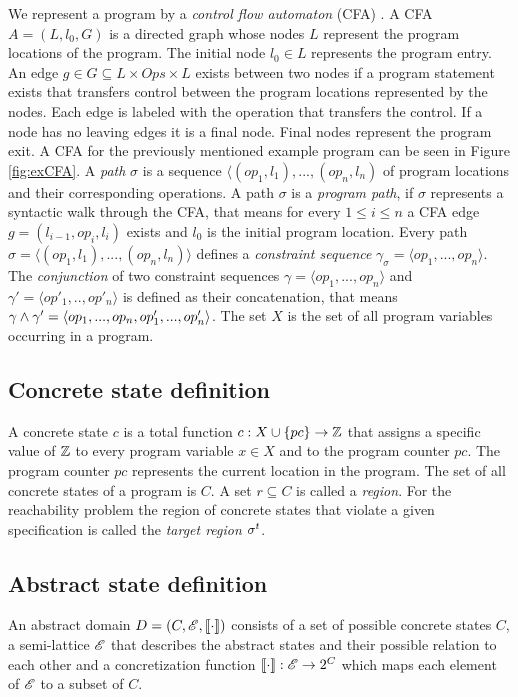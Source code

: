 We represent a program by a \emph{control flow automaton} (CFA) \cite{BeyerBook}\cite{Beyer2012}.
A CFA $A = (L, l_0, G)$ is a directed graph whose nodes $L$ represent the program locations of the program.
The initial node $l_0 \in L$ represents the program entry.
An edge $g \in G \subseteq L \times Ops \times L$ exists between two nodes if a program statement exists that transfers control between the program locations represented by the nodes.
Each edge is labeled with the operation that transfers the control.
If a node has no leaving edges it is a final node. Final nodes represent the program exit.
A CFA for the previously mentioned example program can be seen in Figure \ref{fig:exCFA}.
A \emph{path} $\sigma$ \cite{Beyer2015} is a sequence $\langle (op_1, l_1), ..., (op_n, l_n)$ of program locations and their corresponding operations.
A path $\sigma$ is a \emph{program path}, if $\sigma$ represents a syntactic walk through the CFA, that means for every $1 \leq i \leq n$ a CFA edge $g = (l_{i-1}, op_i, l_i)$ exists and $l_0$ is the initial program location.
Every path $\sigma = \langle (op_1, l_1), ..., (op_n, l_n) \rangle$ defines a \emph{constraint sequence} $\gamma_\sigma = \langle op_1, ..., op_n \rangle$.
The \emph{conjunction} of two constraint sequences $\gamma = \langle op_1, ..., op_n \rangle$ and $\gamma' = \langle op'_1, .., op'_n \rangle$ is defined as their concatenation,
that means $\gamma \wedge \gamma' = \langle op_1, ..., op_n, op'_1, ..., op'_n \rangle$.
The set $X$ is the set of all program variables occurring in a program.

\subsection{Concrete state definition}
A concrete state $c$ is a total function $c: X \cup \{pc\} \rightarrow \mathbb{Z}$ that assigns a specific value of $\mathbb{Z}$ to every program variable $x \in X$ and to the program counter $pc$. The program counter $pc$ represents the current location in the program.
The set of all concrete states of a program is $C$. A set $r \subseteq C$ is called a \emph{region}.
For the reachability problem the region of concrete states that violate a given specification is called the \emph{target region} $\sigma^{t}$.

\subsection{Abstract state definition}
\label{sec:abstractState}
An abstract domain \cite{Beyer2007} $D = (C, \mathscr{E}, \llbracket \cdot \rrbracket)$ consists of a set of possible concrete states $C$, a semi-lattice $\mathscr{E}$ that describes the abstract states and their possible relation to each other and a concretization function $\llbracket \cdot \rrbracket : \mathscr{E} \rightarrow 2^C$ which maps each element of $\mathscr{E}$ to a subset of $C$.

